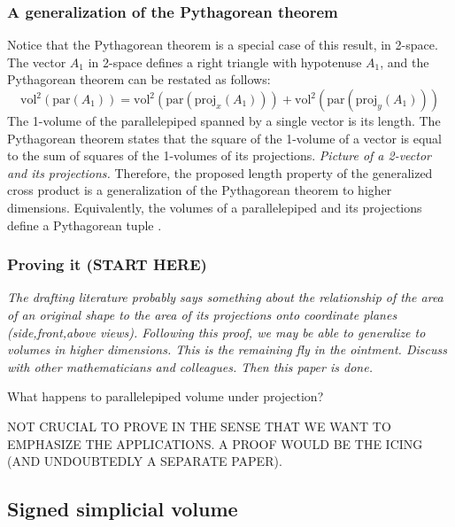 \documentclass[10pt]{article}
\begin{document}
\subsubsection{A generalization of the Pythagorean theorem}

Notice that the Pythagorean theorem is a special case of this result, in 2-space.
The vector $A_1$ in 2-space defines a right triangle with hypotenuse $A_1$,
and the Pythagorean theorem can be restated as follows:
\[
   \mbox{vol}^2 (\mbox{par} (A_1)) = 
   \mbox{vol}^2 (\mbox{par} (\mbox{proj}_x (A_1))) + 
   \mbox{vol}^2 (\mbox{par} (\mbox{proj}_y (A_1)))
\]
The 1-volume of the parallelepiped spanned by a single vector is its length.
The Pythagorean theorem states that the square of the 1-volume of a vector 
is equal to the sum of squares of the 1-volumes of its projections.
{\em Picture of a 2-vector and its projections.}
Therefore, the proposed length property of the generalized cross product is 
a generalization of the Pythagorean theorem to higher dimensions.
Equivalently, the volumes of a parallelepiped and its projections define a
Pythagorean tuple \cite{}.


\subsubsection{Proving it (START HERE)}

{\em The drafting literature probably says something about the relationship of the
area of an original shape to the area of its projections onto coordinate planes
(side,front,above views). Following this proof, we may be able to generalize
to volumes in higher dimensions.
This is the remaining fly in the ointment.  Discuss with other mathematicians and colleagues.  Then this paper is done.}

What happens to parallelepiped volume under projection?

NOT CRUCIAL TO PROVE IN THE SENSE THAT WE WANT TO EMPHASIZE THE APPLICATIONS.
A PROOF WOULD BE THE ICING (AND UNDOUBTEDLY A SEPARATE PAPER).

\clearpage

\subsection{Signed simplicial volume}
\end{document}
